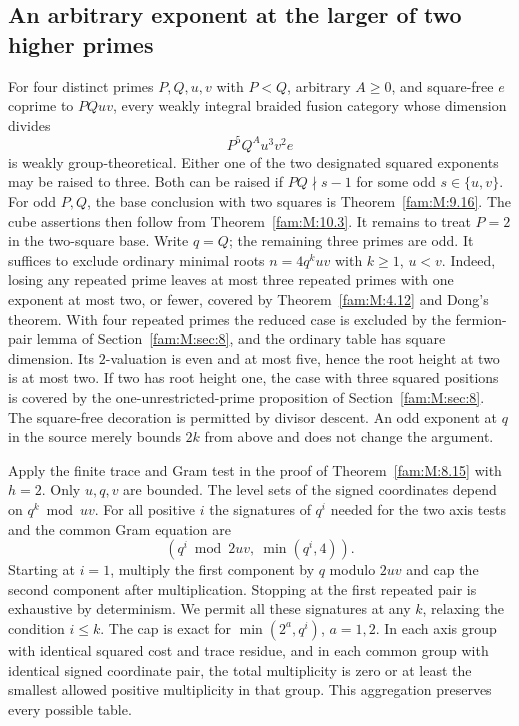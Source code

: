 \documentclass[11pt,a4paper]{article}
\numberwithin{equation}{section}
\theoremstyle{remark}
\begin{document}
\subsection{An arbitrary exponent at the larger of two higher primes}\label{fam:W:sec:5.1}
For four distinct primes $P,Q,u,v$ with $P<Q$, arbitrary $A\ge0$,
and square-free $e$ coprime to $PQuv$, every weakly integral braided
fusion category whose dimension divides
\[
                         P^5 Q^A u^3 v^2 e
\]
is weakly group-theoretical. Either one of the two designated
squared exponents may be raised to three. Both can be raised if
$PQ\nmid s-1$ for some odd $s\in\{u,v\}$.
For odd $P,Q$, the base conclusion with two squares is
Theorem~\ref{fam:M:9.16}. The cube assertions then follow from
Theorem~\ref{fam:M:10.3}. It remains to treat $P=2$ in the two-square
base. Write $q=Q$; the remaining three primes are odd.
It suffices to exclude ordinary minimal roots $n=4q^k uv$ with
$k\ge1$, $u<v$. Indeed, losing any repeated prime leaves at most
three repeated primes with one exponent at most two, or fewer,
covered by Theorem~\ref{fam:M:4.12} and Dong's theorem. With four
repeated primes the reduced case is excluded by the fermion-pair
lemma of Section~\ref{fam:M:sec:8}, and the ordinary table has square dimension.
Its $2$-valuation is even and at most five, hence the root height at two is at most two.
If two has root height one, the case with three squared positions
is covered by the one-unrestricted-prime proposition of
Section~\ref{fam:M:sec:8}. The square-free decoration is permitted by divisor
descent. An odd exponent at $q$ in the source merely bounds $2k$
from above and does not change the argument.

Apply the finite trace and Gram test in the proof of Theorem~\ref{fam:M:8.15} with $h=2$. Only $u,q,v$ are bounded. The
level sets of the signed coordinates depend on $q^k\bmod uv$.
For all positive $i$ the signatures of $q^i$ needed for the two
axis tests and the common Gram equation are
\[
       (q^i\bmod 2uv,\ \min(q^i,4)).
\]
Starting at $i=1$, multiply the first component by $q$ modulo $2uv$
and cap the second component after multiplication. Stopping at the
first repeated pair is exhaustive by determinism. We permit all
these signatures at any $k$, relaxing the condition $i\le k$.
The cap is exact for $\min(2^a,q^i)$, $a=1,2$. In each axis group
with identical squared cost and trace residue, and in each common
group with identical signed coordinate pair, the total multiplicity
is zero or at least the smallest allowed positive multiplicity in
that group. This aggregation preserves every possible table.
\end{document}
